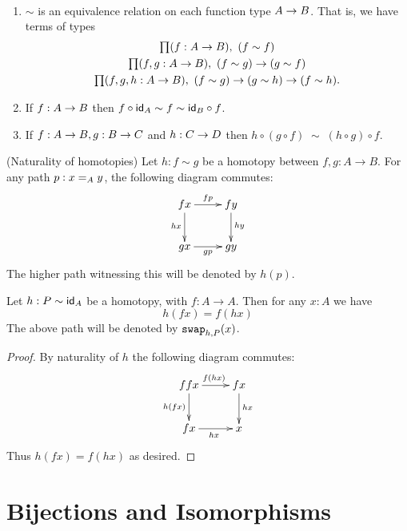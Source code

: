 \begin{lem}\label{lem:homotopy-props}\ 
\begin{enumerate}
\item $\sim$ is an equivalence relation on each function type $A\ra B$.
  That is, we have terms of types
  \begin{gather*}
    \prd{f:A\to B} (f\sim f)\\
    \prd{f,g:A\to B} (f\sim g) \to (g\sim f)\\
    \prd{f,g,h:A\to B} (f\sim g) \to (g\sim h) \to (f\sim h).
  \end{gather*}
\item If $f:A\ra B$ then $f\circ \idfunc[A]\sim f\sim \idfunc[B]\circ f$.
\item If $f:A\ra B, g:B\ra C$ and $h:C\ra D$ then $h\circ (g\circ f)\;\sim\; (h\circ g)\circ f$.
\end{enumerate}
\end{lem}

\begin{lem}\label{lem:hom-nat}
(Naturality of homotopies) Let $h : f \sim g$ be a homotopy between $f,g : A \to B$. For any path $p : \id[A]{x}{y}$, the following diagram commutes:
\begin{align*}
\xymatrix{
fx \ar[r]^{fp} \ar[d]_{hx} & fy \ar[d]^{hy} \\
gx \ar[r]_{gp} & gy
}
\end{align*}
The higher path witnessing this will be denoted by $h(p)$.
\end{lem}

\begin{cor}\label{cor:hom-fg}
Let $h : P \sim \idfunc[A]$ be a homotopy, with $f : A \to A$. Then for any $x : A$ we have \[ h(fx) = f(hx) \] The above path will be denoted by $\com{h}{P}{x}$.
\end{cor}
\begin{proof}
By naturality of $h$ the following diagram commutes:
\begin{align*}
\xymatrix{
ffx \ar[r]^{f(hx)} \ar[d]_{h(fx)} & fx \ar[d]^{hx} \\
fx \ar[r]_{hx} & x
}
\end{align*}
Thus $h(fx) = f(hx)$ as desired.
\end{proof}



\section{Bijections and Isomorphisms}

